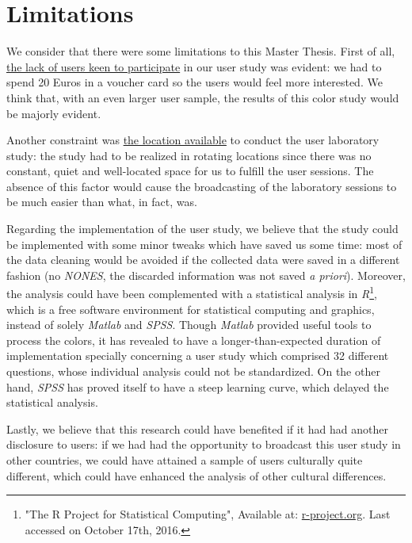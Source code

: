 \section{Limitations}
\label{sec:limitations}
%
We consider that there were some limitations to this Master Thesis. First of all, \ul{the lack of users keen to participate} in our user study was
evident: we had to spend 20 Euros in a voucher card so the users would feel more interested. We think that, with an even larger user sample, the results
of this color study would be majorly evident. \par
%
Another constraint was \ul{the location available} to conduct the user laboratory study: the study had to be realized in rotating locations since there was
no constant, quiet and well-located space for us to fulfill the user sessions. The absence of this factor would cause the broadcasting of the laboratory
sessions to be much easier than what, in fact, was. \par
%
Regarding the implementation of the user study, we believe that the study could be implemented with some minor tweaks which have saved us some time: most
of the data cleaning would be avoided if the collected data were saved in a different fashion (no \emph{NONES}, the discarded information was not saved
\emph{a priori}). Moreover, the analysis could have been complemented with a statistical analysis in \emph{R}\footnote{"The R Project for Statistical Computing", Available at:
\url{r-project.org}. Last accessed on October 17th, 2016.}, which is a free software environment for statistical computing and graphics, instead of solely
\emph{Matlab} and \emph{SPSS}. Though \emph{Matlab} provided useful tools to process the colors, it has revealed to have a longer-than-expected duration of implementation
specially concerning a user study which comprised 32 different questions, whose individual analysis could not be standardized. On the other hand, \emph{SPSS}
has proved itself to have a steep learning curve, which delayed the statistical analysis. \par
%
Lastly, we believe that this research could have benefited if it had had another disclosure to users: if we had had the opportunity to broadcast this user
study in other countries, we could have attained a sample of users culturally quite different, which could have enhanced the analysis of other cultural
differences.
%
